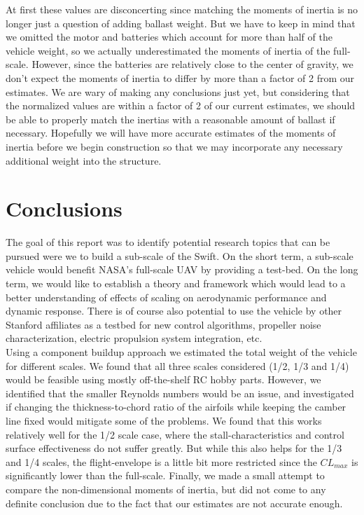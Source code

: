 \documentclass[titlepage,10pt]{article}
\begin{document}
At first these values are disconcerting since matching the moments of inertia is no longer just a question of adding ballast weight. But we have to keep in mind that we omitted the motor and batteries which account for more than half of the vehicle weight, so we actually underestimated the moments of inertia of the full-scale. However, since the batteries are relatively close to the center of gravity, we don't expect the moments of inertia to differ by more than a factor of 2 from our estimates. We are wary of making any conclusions just yet, but considering that the normalized values are within a factor of 2 of our current estimates, we should be able to properly match the inertias with a reasonable amount of ballast if necessary. Hopefully we will have more accurate estimates of the moments of inertia before we begin construction so that we may incorporate any necessary additional weight into the structure.


\newpage
\section{Conclusions}
The goal of this report was to identify potential research topics that can be pursued were we to build a sub-scale of the Swift. On the short term, a sub-scale vehicle would benefit NASA's full-scale UAV by providing a test-bed. On the long term, we would like to establish a theory and framework which would lead to a better understanding of effects of scaling on aerodynamic performance and dynamic response. There is of course also potential to use the vehicle by other Stanford affiliates as a testbed for new control algorithms, propeller noise characterization, electric propulsion system integration, etc. \\

Using a component buildup approach we estimated the total weight of the vehicle for different scales. We found that all three scales considered (1/2, 1/3 and 1/4) would be feasible using mostly off-the-shelf RC hobby parts. However, we identified that the smaller Reynolds numbers would be an issue, and investigated if changing the thickness-to-chord ratio of the airfoils while keeping the camber line fixed would mitigate some of the problems. We found that this works relatively well for the 1/2 scale case, where the stall-characteristics and control surface effectiveness do not suffer greatly. But while this also helps for the 1/3 and 1/4 scales, the flight-envelope is a little bit more restricted since the $CL_{max}$ is significantly lower than the full-scale. Finally, we made a small attempt to compare the non-dimensional moments of inertia, but did not come to any definite conclusion due to the fact that our estimates are not accurate enough.\\
\end{document}
